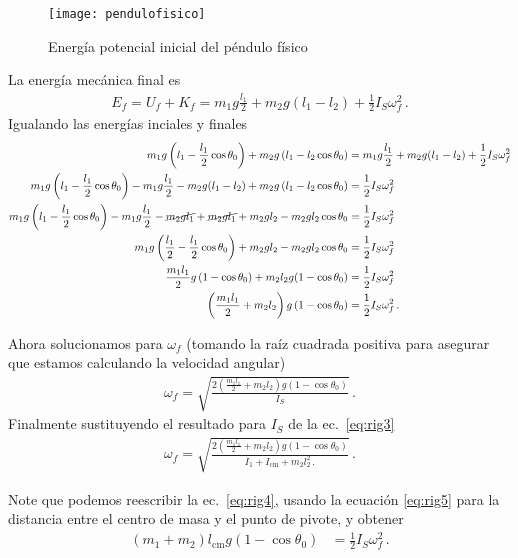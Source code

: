 \begin{figure}
  \centering
  \texttt{[image: pendulofisico]}
  \caption{Energía potencial inicial del péndulo físico}
  \label{fig:pendulofisico}
\end{figure}

La energía mecánica final es
\begin{align}
  E_f=U_f+K_f=m_1 g \frac{l_1}{2}+m_2 g(l_1-l_2)+\frac{1}{2}I_S \omega_f^2\,.
\end{align}
Igualando las energías inciales y finales
\begin{align}
\label{eq:rig4}
  m_1 g  \left(l_1-\frac{l_1}{2}\cos\theta_0  \right)
+m_2 g  \left(l_1-l_2\cos\theta_0  \right)&=m_1 g \frac{l_1}{2}+m_2 g(l_1-l_2)+\frac{1}{2}I_S \omega_f^2\nonumber\\
  m_1 g  \left(l_1-\frac{l_1}{2}\cos\theta_0  \right)-m_1 g \frac{l_1}{2}-m_2 g(l_1-l_2)
+m_2 g  \left(l_1-l_2\cos\theta_0  \right)&=\frac{1}{2}I_S \omega_f^2\nonumber\\
  m_1 g  \left(l_1-\frac{l_1}{2}\cos\theta_0  \right)-m_1 g \frac{l_1}{2}-\cancel{m_2 g l_1}+\cancel{m_2 gl_1}+m_2 gl_2
-m_2 g  l_2\cos\theta_0 &=\frac{1}{2}I_S \omega_f^2\nonumber\\
  m_1 g  \left(\frac{l_1}{2}-\frac{l_1}{2}\cos\theta_0  \right)+m_2 gl_2
-m_2 g  l_2\cos\theta_0 &=\frac{1}{2}I_S \omega_f^2\nonumber\\
  \frac{m_1 l_1}{2}g \left(1-\cos\theta_0  \right)+
m_2 l_2 g(1-\cos\theta_0) &=\frac{1}{2}I_S \omega_f^2\nonumber\\
  \left(\frac{m_1 l_1}{2}+ m_2 l_2 \right)g \left(1-\cos\theta_0  \right) &=\frac{1}{2}I_S \omega_f^2\,.
\end{align}

Ahora solucionamos para $\omega_f$ (tomando la raíz cuadrada positiva para asegurar que estamos calculando la velocidad angular)
\begin{align}
  \omega_f=\sqrt{\frac{2\left(\frac{m_1 l_1}{2}+ m_2 l_2 \right)g \left(1-\cos\theta_0  \right)}{I_S}}\,.
\end{align}
Finalmente sustituyendo el resultado para $I_S$ de la ec.~\eqref{eq:rig3}
\begin{align}
    \omega_f=\sqrt{\frac{2\left(\frac{m_1 l_1}{2}+ m_2 l_2 \right)g \left(1-\cos\theta_0  \right)}{I_1+I_{\text{cm}}+m_2 l_2^2\,.}}\,.
\end{align}

Note que podemos reescribir la ec.~\eqref{eq:rig4}, usando la ecuación \eqref{eq:rig5} para la distancia entre el centro de masa y el punto de pivote, y obtener
\begin{align}
\label{eq:rig6}
 (m_1+m_2)l_{\text{cm}} g \left(1-\cos\theta_0  \right) &=\frac{1}{2}I_S \omega_f^2\,. 
\end{align}

